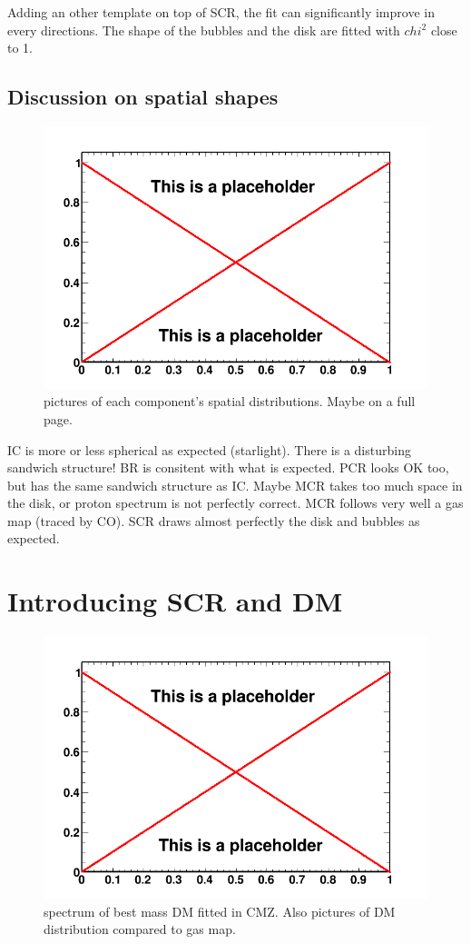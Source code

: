 Adding an other template on top of SCR, the fit can significantly improve in every directions. The shape of the bubbles and the disk are fitted with $chi^2$ close to 1. 


\subsection{Discussion on spatial shapes}
\begin{figure}
  \centering
  \includegraphics[width=.9\linewidth]{pic/dummy.png}
  \caption{pictures of each component's spatial distributions. Maybe on a full page.}
  \label{fig:spatial_shapes}
\end{figure}
IC is more or less spherical as expected (starlight). There is a disturbing sandwich structure!
BR is consitent with what is expected.
PCR looks OK too, but has the same sandwich structure as IC. Maybe MCR takes too much space in the disk, or proton spectrum is not perfectly correct.
MCR follows very well a gas map (traced by CO).
SCR draws almost perfectly the disk and bubbles as expected.


\section{Introducing SCR and DM}

\begin{figure}
  \centering
  \includegraphics[width=.9\linewidth]{pic/dummy.png}
  \caption{spectrum of best mass DM fitted in CMZ. Also pictures of DM distribution compared to gas map.}
  \label{fig:DMonly_fit}
\end{figure}

